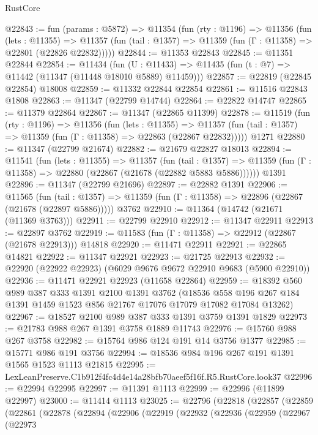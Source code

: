 \begin{lexlean}{RustCore}
\begin{coremodule}
@22843 := fun (params : @5872) =>
  @11354
    (fun (rty : @1196) =>
    @11356
      (fun (lets : @11355) =>
      @11357 (fun (tail : @1357) => @11359 (fun (Γ : @11358) => @22801 (@22826 @22832)))))
@22844 := @11353 @22843
@22845 := @11351 @22844
@22854 := @11434
    (fun (U : @11433) => @11435 (fun (t : @7) => @11442 (@11347 (@11448 @18010 @5889) @11459)))
@22857 := @22819 (@22845 @22854) @18008
@22859 := @11332 @22844 @22854
@22861 := @11516 @22843 @1808
@22863 := @11347 (@22799 @14744)
@22864 := @22822 @14747
@22865 := @11379 @22864
@22867 := @11347 (@22865 @11399)
@22878 := @11519
    (fun (rty : @1196) =>
    @11356
      (fun (lets : @11355) =>
      @11357 (fun (tail : @1357) => @11359 (fun (Γ : @11358) => @22863 (@22867 @22832)))))
    @1271
@22880 := @11347 (@22799 @21674)
@22882 := @21679 @22827 @18013
@22894 := @11541
    (fun (lets : @11355) =>
    @11357
      (fun (tail : @1357) =>
      @11359 (fun (Γ : @11358) => @22880 (@22867 (@21678 (@22882 @5883 @5886))))))
    @1391
@22896 := @11347 (@22799 @21696)
@22897 := @22882 @1391
@22906 := @11565
    (fun (tail : @1357) => @11359 (fun (Γ : @11358) => @22896 (@22867 (@21678 (@22897 @5886)))))
    @3762
@22910 := @11364 (@14742 (@21671 (@11369 @3763)))
@22911 := @22799 @22910
@22912 := @11347 @22911
@22913 := @22897 @3762
@22919 := @11583 (fun (Γ : @11358) => @22912 (@22867 (@21678 @22913))) @14818
@22920 := @11471 @22911
@22921 := @22865 @14821
@22922 := @11347 @22921
@22923 := @21725 @22913
@22932 := @22920 (@22922 @22923) (@6029 @9676 @9672 @22910 @9683 (@5900 @22910))
@22936 := @11471 @22921 @22923 (@11658 @22864)
@22959 := @18392
    @560
    @989
    @387
    @333
    @1391
    @2100
    @1391
    @3762
    (@18536 @558 @196 @267 @184 @1391 @1459 @1523 @856 @21767 @17076 @17079 @17082 @17084 @13262)
@22967 := @18527 @2100 @989 @387 @333 @1391 @3759 @1391 @1829
@22973 := @21783 @988 @267 @1391 @3758 @1889 @11743
@22976 := @15760 @988 @267 @3758
@22982 := @15764 @986 @124 @191 @14 @3756 @1377
@22985 := @15771 @986 @191 @3756
@22994 := @18536 @984 @196 @267 @191 @1391 @1565 @1523 @1113 @21815
@22995 := LexLeanPreserve.C1b912f4fc4d4e14a28bfb70aeef5f16f.R5.RustCore.look37
@22996 := @22994 @22995
@22997 := @11391 @1113
@22999 := @22996 (@11899 @22997)
@23000 := @11414 @1113
@23025 := @22796
    (@22818
      (@22857
        (@22859
          (@22861
            (@22878
              (@22894
                (@22906
                  (@22919
                    (@22932
                      (@22936
                        (@22959
                          (@22967
                            (@22973

\end{coremodule}
\end{lexlean}
